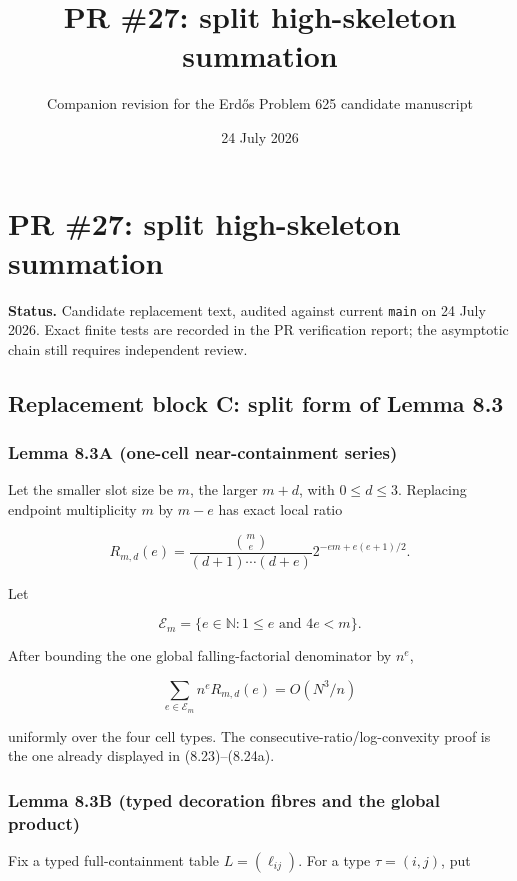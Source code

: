 \documentclass[11pt]{article}
\title{PR \#27: split high-skeleton summation}
\author{Companion revision for the Erd\H{o}s Problem 625 candidate manuscript}
\date{24 July 2026}
\begin{document}
\maketitle
\section{PR \#27: split high-skeleton summation}\label{pr-27-split-high-skeleton-summation}

\textbf{Status.} Candidate replacement text, audited against current \texttt{main} on 24 July 2026. Exact finite tests are recorded in the PR verification report; the asymptotic chain still requires independent review.

\subsection{Replacement block C: split form of Lemma 8.3}\label{replacement-block-c-split-form-of-lemma-8.3}

\subsubsection{Lemma 8.3A (one-cell near-containment series)}\label{lemma-8.3a-one-cell-near-containment-series}

Let the smaller slot size be \(m\), the larger \(m+d\), with \(0\le d\le3\). Replacing endpoint multiplicity \(m\) by \(m-e\) has exact local ratio

\[
 R_{m,d}(e)=
 \frac{\binom me}{(d+1)\cdots(d+e)}
 2^{-em+e(e+1)/2}.
 \tag{8.21}
\]

Let

\[
 \mathcal E_m=\{e\in\mathbb N:1\le e\text{ and }4e<m\}.
\]

After bounding the one global falling-factorial denominator by \(n^e\),

\[
 \sum_{e\in\mathcal E_m} n^eR_{m,d}(e)=O(N^3/n)
 \tag{8.25}
\]

uniformly over the four cell types. The consecutive-ratio/log-convexity proof is the one already displayed in (8.23)--(8.24a).

\subsubsection{Lemma 8.3B (typed decoration fibres and the global product)}\label{lemma-8.3b-typed-decoration-fibres-and-the-global-product}

Fix a typed full-containment table \(L=(\ell_{ij})\). For a type \(\tau=(i,j)\), put
\end{document}
